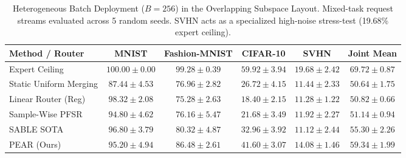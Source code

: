 \begin{table}[t]
\caption{Heterogeneous Batch Deployment ($B = 256$) in the Overlapping Subspace Layout. Mixed-task request streams evaluated across 5 random seeds. SVHN acts as a specialized high-noise stress-test (19.68\% expert ceiling).}
\label{tab:heterogeneous_256}
\vskip 0.15in
\begin{center}
\begin{small}
\begin{sc}
\begin{tabular}{lccccc}
\toprule
Method / Router & MNIST & Fashion-MNIST & CIFAR-10 & SVHN & Joint Mean \\
\midrule
Expert Ceiling & $100.00 \pm 0.00$ & $99.28 \pm 0.39$ & $59.92 \pm 3.94$ & $19.68 \pm 2.42$ & $\mathbf{69.72 \pm 0.87}$ \\
Static Uniform Merging & $87.44 \pm 4.53$ & $76.96 \pm 2.82$ & $26.72 \pm 4.15$ & $11.44 \pm 2.33$ & $\mathbf{50.64 \pm 1.75}$ \\
Linear Router (Reg) & $98.32 \pm 2.08$ & $75.28 \pm 2.63$ & $18.40 \pm 2.15$ & $11.28 \pm 1.22$ & $\mathbf{50.82 \pm 0.66}$ \\
Sample-Wise PFSR & $94.80 \pm 4.62$ & $76.16 \pm 5.47$ & $21.68 \pm 3.49$ & $11.92 \pm 2.27$ & $\mathbf{51.14 \pm 0.94}$ \\
SABLE SOTA & $96.80 \pm 3.79$ & $80.32 \pm 4.87$ & $32.96 \pm 3.92$ & $11.12 \pm 2.44$ & $\mathbf{55.30 \pm 2.26}$ \\
\midrule
PEAR (Ours) & $95.20 \pm 4.94$ & $86.48 \pm 2.61$ & $41.60 \pm 3.07$ & $14.08 \pm 1.46$ & $\mathbf{59.34 \pm 1.99}$ \\
\bottomrule
\end{tabular}
\end{sc}
\end{small}
\end{center}
\vskip -0.1in
\end{table}

